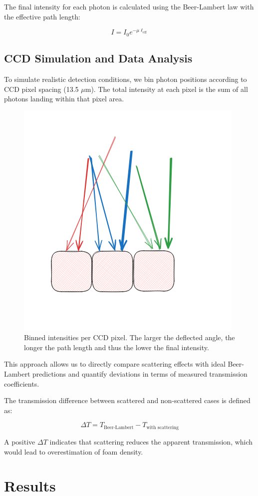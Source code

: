 \documentclass[twocolumn]{aastex701}
\begin{document}
The final intensity for each photon is calculated using the Beer-Lambert law with the effective path length:

\begin{equation}
\label{eq:intensity}
    I = I_0 e^{-\mu \ell_{\text{eff}}}
\end{equation}

\subsection{CCD Simulation and Data Analysis}

To simulate realistic detection conditions, we bin photon positions according to CCD pixel spacing (13.5 $\mu$m). 
The total intensity at each pixel is the sum of all photons landing within that pixel area.
\begin{figure}[t]
    \centering
    \includegraphics[width=0.45\linewidth]{netintensity.png}
    \caption{Binned intensities per CCD pixel. The larger the deflected angle, the longer the path length and thus the lower the final intensity.}
    \label{fig:netintensity}
\end{figure}
This approach allows us to directly compare scattering effects with ideal Beer-Lambert predictions and quantify deviations in terms of measured transmission coefficients.

The transmission difference between scattered and non-scattered cases is defined as:

\begin{equation}
\Delta T = T_{\text{Beer-Lambert}} - T_{\text{with scattering}}
\end{equation}

A positive $\Delta T$ indicates that scattering reduces the apparent transmission, which would lead to overestimation of foam density.

\section{Results}
\end{document}

